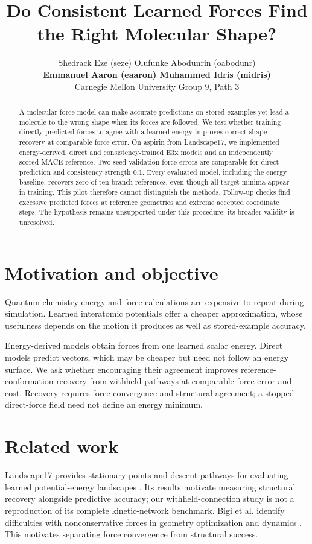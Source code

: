 \documentclass{article}
\title{Do Consistent Learned Forces Find the Right Molecular Shape?}
\author{Shedrack Eze (seze) \quad Olufunke Abodunrin (oabodunr)\\
\textbf{Emmanuel Aaron (eaaron) \quad Muhammed Idris (midris)}\\
Carnegie Mellon University \quad Group 9, Path 3}
\begin{document}
\maketitle
\begin{abstract}
A molecular force model can make accurate predictions on stored examples yet lead a molecule to the wrong shape when its forces are followed. We test whether training directly predicted forces to agree with a learned energy improves correct-shape recovery at comparable force error. On aspirin from Landscape17, we implemented energy-derived, direct and consistency-trained E3x models and an independently scored MACE reference. Two-seed validation force errors are comparable for direct prediction and consistency strength 0.1. Every evaluated model, including the energy baseline, recovers zero of ten branch references, even though all target minima appear in training. This pilot therefore cannot distinguish the methods. Follow-up checks find excessive predicted forces at reference geometries and extreme accepted coordinate steps. The hypothesis remains unsupported under this procedure; its broader validity is unresolved.
\end{abstract}
\section{Motivation and objective}
Quantum-chemistry energy and force calculations are expensive to repeat during simulation. Learned interatomic potentials offer a cheaper approximation, whose usefulness depends on the motion it produces as well as stored-example accuracy.

Energy-derived models obtain forces from one learned scalar energy. Direct models predict vectors, which may be cheaper but need not follow an energy surface. We ask whether encouraging their agreement improves reference-conformation recovery from withheld pathways at comparable force error and cost. Recovery requires force convergence and structural agreement; a stopped direct-force field need not define an energy minimum.
\section{Related work}
Landscape17 provides stationary points and descent pathways for evaluating learned potential-energy landscapes \cite{landscape}. Its results motivate measuring structural recovery alongside predictive accuracy; our withheld-connection study is not a reproduction of its complete kinetic-network benchmark. Bigi et al. identify difficulties with nonconservative forces in geometry optimization and dynamics \cite{bigi}. This motivates separating force convergence from structural success.
\end{document}
